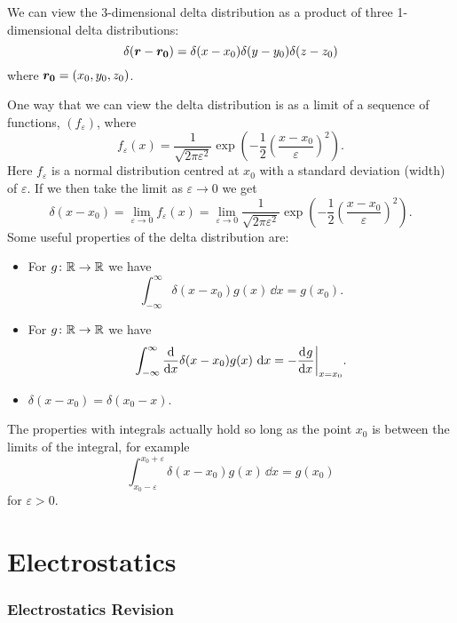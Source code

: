     We can view the 3-dimensional delta distribution as a product of three 1-dimensional delta distributions:
    \[\delta(\bm{r} - \bm{r_0}) = \delta(x - x_0)\delta(y - y_0)\delta(z - z_0)\]
    where \(\bm{r_0} = (x_0, y_0, z_0)\).
    
    One way that we can view the delta distribution is as a limit of a sequence of functions, \((f_\varepsilon)\), where
    \[f_\varepsilon(x) = \frac{1}{\sqrt{2\pi\varepsilon^2}}\exp\left(-\frac{1}{2}\left(\frac{x - x_0}{\varepsilon}\right)^2\right).\]
    Here \(f_\varepsilon\) is a normal distribution centred at \(x_0\) with a standard deviation (width) of \(\varepsilon\).
    If we then take the limit as \(\varepsilon \to 0\) we get
    \[\delta(x - x_0) = \lim_{\varepsilon\to 0}f_\varepsilon(x) = \lim_{\varepsilon\to 0} \frac{1}{\sqrt{2\pi\varepsilon^2}}\exp\left(-\frac{1}{2}\left(\frac{x - x_0}{\varepsilon}\right)^2\right).\]
    Some useful properties of the delta distribution are:
    \begin{itemize}
        \item For \(g\colon\mathbb{R}\to\mathbb{R}\) we have
        \[\int_{-\infty}^{\infty} \delta(x - x_0)g(x)\,\dd{x} = g(x_0).\]
        \item For \(g\colon\mathbb{R}\to\mathbb{R}\) we have
        \[\int_{-\infty}^{\infty} \dv{x}\delta(x - x_0)g(x)\,\dd{x} = -\dv[]{g}{x}\biggr|_{x=x_0}.\]
        \item \(\delta(x - x_0) = \delta(x_0 - x)\).
    \end{itemize}
    The properties with integrals actually hold so long as the point \(x_0\) is between the limits of the integral, for example
    \[\int_{x_0-\varepsilon}^{x_0+\varepsilon} \delta(x - x_0)g(x)\,\dd{x} = g(x_0)\]
    for \(\varepsilon > 0\).
    
    \part{Electrostatics}
    \section{Electrostatics Revision}
